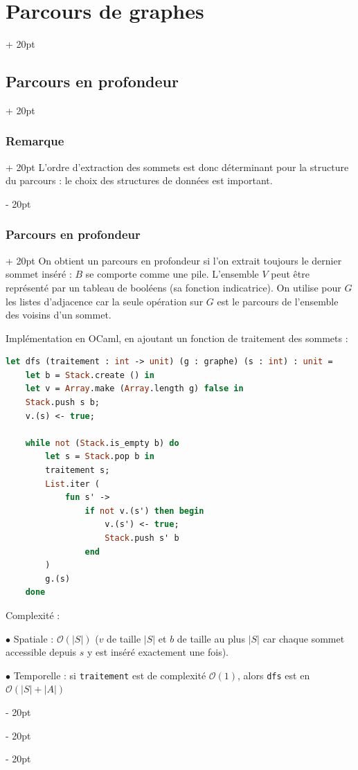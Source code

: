 \documentclass[a4paper, 12pt, twoside]{article}
\newcommand{\lr}[1]{\left( #1 \right)}
\newcommand{\abs}[1]{\left\lvert #1 \right\rvert}
\newcommand{\ind}[1][20pt]{\advance\leftskip + #1}
\newcommand{\deind}[1][20pt]{\advance\leftskip - #1}
\newenvironment{indt}[2][20pt]{#2 \par \ind[#1]}{\par \deind} %
\begin{document}
\begin{indt}{\section{Parcours de graphes}}
\begin{indt}{\subsection{Parcours en profondeur}}
\begin{indt}{\subsubsection{Remarque}}
                L'ordre d'extraction des sommets est donc déterminant pour la structure du parcours : le choix des structures de données est important.
            \end{indt}

            \vspace{12pt}
            
            \begin{indt}{\subsubsection{Parcours en profondeur}}
                On obtient un parcours en profondeur si l'on extrait toujours le dernier sommet inséré : $B$ se comporte comme une pile.
                L'ensemble $V$ peut être représenté par un tableau de booléens (sa fonction indicatrice).
                On utilise pour $G$ les listes d'adjacence car la seule opération sur $G$ est le parcours de l'ensemble des voisins d'un sommet.

                \vspace{12pt}
                
                Implémentation en OCaml, en ajoutant un fonction de traitement des sommets :

                \begin{lstlisting}[language=Caml, xleftmargin=80pt]
let dfs (traitement : int -> unit) (g : graphe) (s : int) : unit =
    let b = Stack.create () in
    let v = Array.make (Array.length g) false in
    Stack.push s b;
    v.(s) <- true;

    while not (Stack.is_empty b) do
        let s = Stack.pop b in
        traitement s;
        List.iter (
            fun s' ->
                if not v.(s') then begin
                    v.(s') <- true;
                    Stack.push s' b
                end
        )
        g.(s)
    done\end{lstlisting}

                \vspace{12pt}
                
                Complexité :

                $\bullet$ Spatiale : $\mathcal O(\abs S)$ ($v$ de taille $\abs S$ et $b$ de taille au plus $\abs S$ car chaque sommet accessible depuis $s$ y est inséré exactement une fois).

                $\bullet$ Temporelle : si \texttt{traitement} est de complexité $\mathcal O(1)$, alors \texttt{dfs} est en $\mathcal O\!\lr{\abs S + \abs A}$


\end{indt}
\end{indt}
\end{indt}
\end{document}
